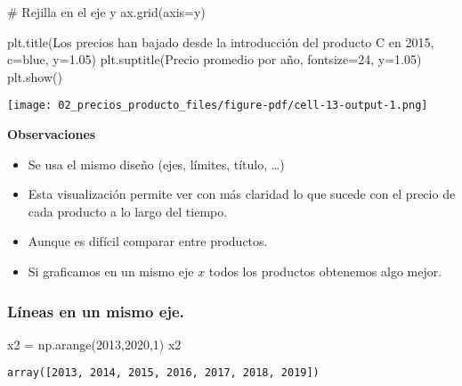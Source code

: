 \documentclass[
  letterpaper,
  DIV=11,
  numbers=noendperiod]{scrreprt}
\newenvironment{Shaded}{\begin{snugshade}}{\end{snugshade}}
\newcommand{\CommentTok}[1]{\textcolor[rgb]{0.37,0.37,0.37}{#1}}
\newcommand{\DecValTok}[1]{\textcolor[rgb]{0.68,0.00,0.00}{#1}}
\newcommand{\FloatTok}[1]{\textcolor[rgb]{0.68,0.00,0.00}{#1}}
\newcommand{\NormalTok}[1]{\textcolor[rgb]{0.00,0.23,0.31}{#1}}
\newcommand{\OperatorTok}[1]{\textcolor[rgb]{0.37,0.37,0.37}{#1}}
\newcommand{\StringTok}[1]{\textcolor[rgb]{0.13,0.47,0.30}{#1}}
\providecommand{\tightlist}{%
  \setlength{\itemsep}{0pt}\setlength{\parskip}{0pt}}\usepackage{longtable,booktabs,array}
\begin{document}
\begin{Shaded}
\begin{Highlighting}[]
\CommentTok{\# Rejilla en el eje y}
\NormalTok{ax.grid(axis}\OperatorTok{=}\StringTok{\textquotesingle{}y\textquotesingle{}}\NormalTok{)}

\NormalTok{plt.title(}\StringTok{\textquotesingle{}Los precios han bajado desde la introducción del producto C en 2015\textquotesingle{}}\NormalTok{, c}\OperatorTok{=}\StringTok{\textquotesingle{}blue\textquotesingle{}}\NormalTok{, y}\OperatorTok{=}\FloatTok{1.05}\NormalTok{)}
\NormalTok{plt.suptitle(}\StringTok{\textquotesingle{}Precio promedio por año\textquotesingle{}}\NormalTok{, fontsize}\OperatorTok{=}\DecValTok{24}\NormalTok{, y}\OperatorTok{=}\FloatTok{1.05}\NormalTok{)}
\NormalTok{plt.show()}
\end{Highlighting}
\end{Shaded}

\texttt{[image: 02\_precios\_producto\_files/figure-pdf/cell-13-output-1.png]}

\textbf{Observaciones}

\begin{itemize}
\tightlist
\item
  Se usa el mismo diseño (ejes, límites, título, \ldots)
\item
  Esta visualización permite ver con más claridad lo que sucede con el
  precio de cada producto a lo largo del tiempo.
\item
  Aunque es difícil comparar entre productos.
\item
  Si graficamos en un mismo eje \(x\) todos los productos obtenemos algo
  mejor.
\end{itemize}

\subsubsection{Líneas en un mismo
eje.}\label{luxedneas-en-un-mismo-eje.}

\begin{Shaded}
\begin{Highlighting}[]
\NormalTok{x2 }\OperatorTok{=}\NormalTok{ np.arange(}\DecValTok{2013}\NormalTok{,}\DecValTok{2020}\NormalTok{,}\DecValTok{1}\NormalTok{)}
\NormalTok{x2}
\end{Highlighting}
\end{Shaded}

\begin{verbatim}
array([2013, 2014, 2015, 2016, 2017, 2018, 2019])
\end{verbatim}
\end{document}
